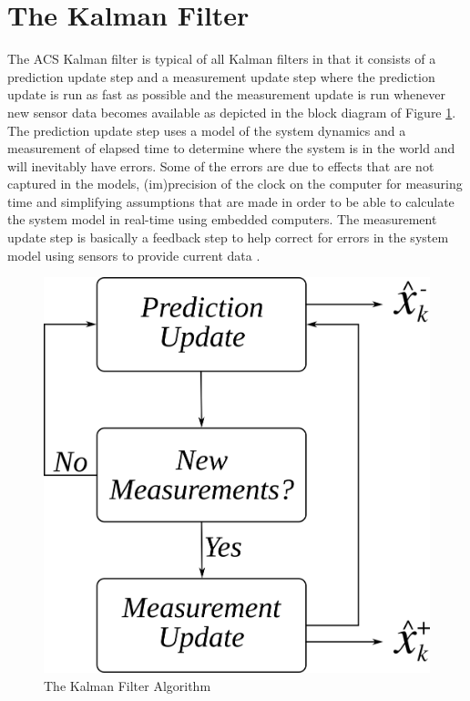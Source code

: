 \section{The Kalman Filter}
\label{sec:kalmanfilter}
The ACS Kalman filter is typical of all Kalman filters in that it consists of a prediction update step and a measurement update step where the prediction update is run as fast as possible and the measurement update is run whenever new sensor data becomes available as depicted in the block diagram of Figure \ref{fig:kf}. The prediction update step uses a model of the system dynamics and a measurement of elapsed time to determine where the system is in the world and will inevitably have errors. Some of the errors are due to effects that are not captured in the models, (im)precision of the clock on the computer for measuring time and simplifying assumptions that are made in order to be able to calculate the system model in real-time using embedded computers. The measurement update step is basically a feedback step to help correct for errors in the system model using sensors to provide current data \cite{Kelly_1994_338}.

\begin{figure}[ht!]
	\centering
	\includegraphics[width=.4\textwidth]{images/kf}
	\caption{The Kalman Filter Algorithm}
	\label{fig:kf}
\end{figure}

